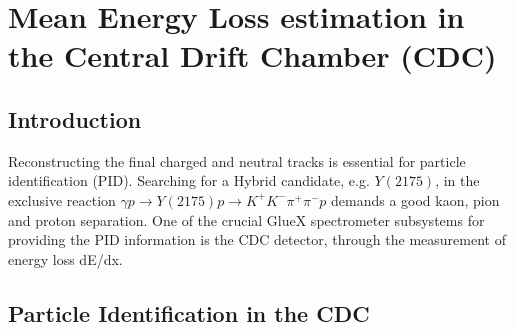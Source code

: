 \section{Mean Energy Loss estimation in the Central Drift Chamber (CDC)}
\label{p3}

\subsection{Introduction}

Reconstructing the final charged and neutral tracks is essential for particle identification (PID). Searching for a Hybrid candidate, e.g. $Y(2175)$, in the exclusive reaction $\gamma p \rightarrow Y(2175) p \rightarrow K^{+}K^{-}\pi^{+}\pi^{-}p$ demands a good kaon, pion and proton separation. One of the crucial GlueX spectrometer subsystems for providing the PID information is the CDC detector, through the measurement of energy loss dE/dx.

\subsection{Particle Identification in the CDC}

